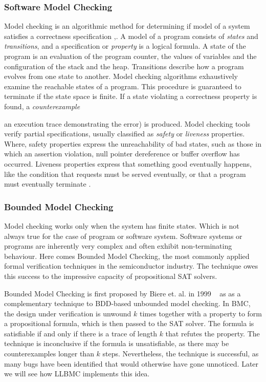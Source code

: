 \documentclass[14pt]{article}
\begin{document}
\subsubsection*{Software Model Checking}\label{Software Model Checking}
Model checking is an algorithmic method for determining if model of a system satisfies a correctness specification \cite{MC1},\cite{MC2}. A model of a program consists of \textit{states} and \textit{transitions}, and a specification or \textit{property} is a logical formula. A state of the program is an evaluation of the program counter, the values of variables and the configuration of the stack and the heap. Transitions describe how a program evolves from one state to another. Model checking algorithms exhaustively examine the reachable states of a program. This procedure is guaranteed to terminate if the state space is finite. If a state violating a correctness property is found, a \textit{counterexample}{ an execution trace demonstrating the error) is produced. Model checking tools verify partial specifications, usually classified as \textit{safety} or \textit{liveness} properties. Where, safety properties express the unreachability of bad states, such as those in which an assertion violation, null pointer dereference or buffer overflow has occurred. Liveness properties express that something good eventually happens, like the condition that requests must be served eventually, or that a program must eventually terminate \cite{MC3}.

\subsubsection*{Bounded Model Checking}\label{bounded model checking}
Model checking works only when the system has finite states. Which is not always true for the case of program or software system. Software systems or programs are inherently very complex and often exhibit non-terminating behaviour. Here comes Bounded Model Checking,  the most commonly applied formal verification techniques in the semiconductor industry. The technique owes this success to the impressive
capacity of propositional SAT solvers. 
					
Bounded Model Checking is first proposed by Biere et. al. in 1999 ~\cite{1} as as a complementary technique to BDD-based unbounded model checking. In BMC, the design under verification is unwound \(k\) times together with a property to form a propositional formula, which is then passed to the SAT solver.
The formula is satisfiable if and only if there is a trace of length \(k\) that refutes the property. The technique is inconclusive if the formula is unsatisfiable, as there may be counterexamples longer than \(k\) steps. Nevertheless, the technique is successful, as many bugs have been identified that would otherwise have gone unnoticed. Later we will see how LLBMC implements this idea.

}
\end{document}
